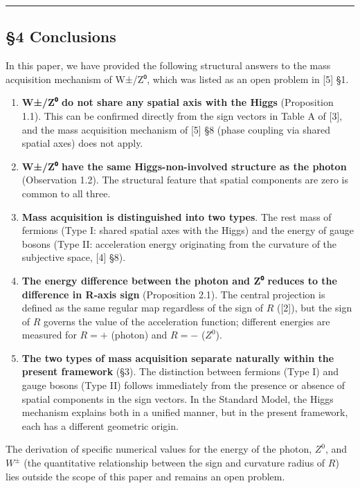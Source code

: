 \documentclass[
  a4paper,11pt]{article}
\theoremstyle{definition}
\theoremstyle{remark}
\begin{document}
\begin{center}\rule{0.5\linewidth}{0.5pt}\end{center}

\subsection{§4 Conclusions}\label{conclusions}

In this paper, we have provided the following structural answers to the
mass acquisition mechanism of W±/Z⁰, which was listed as an open problem
in {[}5{]} §1.

\begin{enumerate}
\def\labelenumi{\arabic{enumi}.}
\item
  \textbf{W±/Z⁰ do not share any spatial axis with the Higgs}
  (Proposition 1.1). This can be confirmed directly from the sign
  vectors in Table A of {[}3{]}, and the mass acquisition mechanism of
  {[}5{]} §8 (phase coupling via shared spatial axes) does not apply.
\item
  \textbf{W±/Z⁰ have the same Higgs-non-involved structure as the
  photon} (Observation 1.2). The structural feature that spatial
  components are zero is common to all three.
\item
  \textbf{Mass acquisition is distinguished into two types}. The rest
  mass of fermions (Type I: shared spatial axes with the Higgs) and the
  energy of gauge bosons (Type II: acceleration energy originating from
  the curvature of the subjective space, {[}4{]} §8).
\item
  \textbf{The energy difference between the photon and Z⁰ reduces to the
  difference in R-axis sign} (Proposition 2.1). The central projection
  is defined as the same regular map regardless of the sign of \(R\)
  ({[}2{]}), but the sign of \(R\) governs the value of the acceleration
  function; different energies are measured for \(R = +\) (photon) and
  \(R = -\) (\(Z^0\)).
\item
  \textbf{The two types of mass acquisition separate naturally within
  the present framework} (§3). The distinction between fermions (Type I)
  and gauge bosons (Type II) follows immediately from the presence or
  absence of spatial components in the sign vectors. In the Standard
  Model, the Higgs mechanism explains both in a unified manner, but in
  the present framework, each has a different geometric origin.
\end{enumerate}

The derivation of specific numerical values for the energy of the
photon, \(Z^0\), and \(W^{\pm}\) (the quantitative relationship between
the sign and curvature radius of \(R\)) lies outside the scope of this
paper and remains an open problem.
\end{document}
